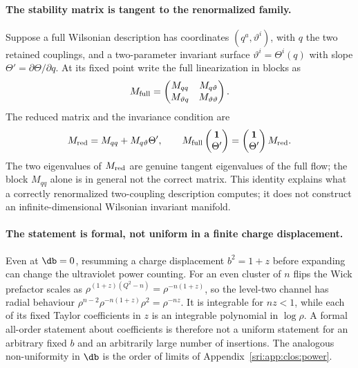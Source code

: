 \paragraph{The stability matrix is tangent to the renormalized family.} Suppose a full Wilsonian description has
coordinates $(q^a,\vartheta^i)$, with $q$ the two retained couplings, and a two-parameter invariant surface
$\vartheta^i=\Theta^i(q)$ with slope $\Theta'=\partial\Theta/\partial q$. At its fixed point write the full
linearization in blocks as
\begin{equation}
 M_{\rm full}=\begin{pmatrix}M_{qq}&M_{q\vartheta}\\ M_{\vartheta q}&M_{\vartheta\vartheta}\end{pmatrix}.
\end{equation}
The reduced matrix and the invariance condition are
\begin{equation}
 M_{\rm red}=M_{qq}+M_{q\vartheta}\Theta',\qquad
 M_{\rm full}\begin{pmatrix}\mathbf 1\\ \Theta'\end{pmatrix}=\begin{pmatrix}\mathbf 1\\ \Theta'\end{pmatrix}M_{\rm red}.
\end{equation}
The two eigenvalues of $M_{\rm red}$ are genuine tangent eigenvalues of the full flow; the block $M_{qq}$ alone is in
general not the correct matrix. This identity explains what a correctly renormalized two-coupling description
computes; it does not construct an infinite-dimensional Wilsonian invariant manifold.

\paragraph{The statement is formal, not uniform in a finite charge displacement.} Even at $\db=0$, resumming a charge
displacement $b^2=1+z$ before expanding can change the ultraviolet power counting. For an even cluster of $n$ flips the
Wick prefactor scales as $\rho^{(1+z)(Q^2-n)}=\rho^{-n(1+z)}$, so the level-two channel has radial behaviour
$\rho^{n-2}\rho^{-n(1+z)}\rho^2=\rho^{-nz}$. It is integrable for $nz<1$, while each of its fixed Taylor coefficients in
$z$ is an integrable polynomial in $\log\rho$. A formal all-order statement about coefficients is therefore not a
uniform statement for an arbitrary fixed $b$ and an arbitrarily large number of insertions. The analogous
non-uniformity in $\db$ is the order of limits of Appendix~\ref{sri:app:clos:power}.

